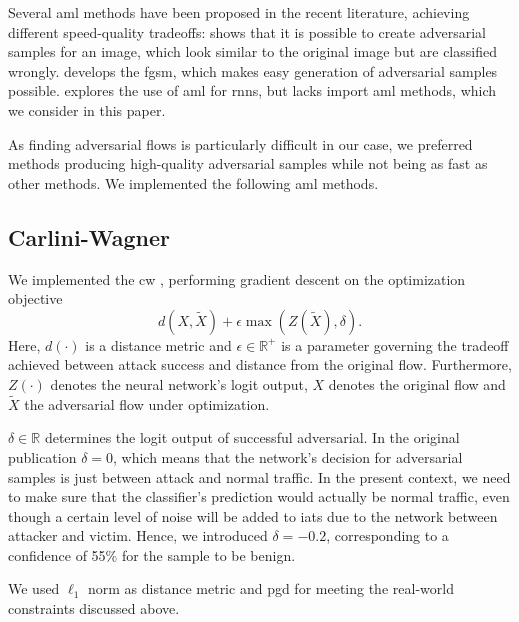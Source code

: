 \documentclass[conference]{IEEEtran}
\begin{document}
Several \gls{aml} methods have been proposed in the recent literature, achieving different speed-quality tradeoffs: 
\cite{szegedy_intriguing_2014} shows that it is possible to create adversarial samples for an image, which look similar to the original image but are classified wrongly. \cite{goodfellow_explaining_2015} develops the \gls{fgsm}, which makes easy generation of adversarial samples possible. \cite{papernot_crafting_2016} explores the use of \gls{aml} for \glspl{rnn}, but lacks import \gls{aml} methods, which we consider in this paper.

As finding adversarial flows is particularly difficult in our case, %
we preferred methods  producing high-quality adversarial samples while not being as fast as other methods. We implemented the following \gls{aml} methods.

\subsection{Carlini-Wagner}
We implemented the \gls{cw} \cite{carlini_towards_2017}, performing gradient descent on the optimization objective
\begin{equation} \label{eq:carliniWagner}
d(X,\tilde X) + \epsilon  \max(Z(\tilde X), \delta).
\end{equation}
Here, $d(\cdot)$ is a distance metric and $\epsilon \in \mathbb R^+$ is a parameter governing the tradeoff achieved between attack success and distance from the original flow. Furthermore, $Z(\cdot)$ denotes the neural network's logit output, $X$ denotes the original flow and $\tilde X$ the adversarial flow under optimization.

$\delta \in \mathbb R$ determines the logit output of successful adversarial.
In the original publication $\delta=0$, which means that the network's decision for adversarial samples is just between attack and normal traffic. In the present context, we need to make sure that the classifier's prediction would actually be normal traffic, even though a certain level of noise will be added to \glspl{iat} due to the network between attacker and victim. Hence, we introduced $\delta=-0.2$, corresponding to a confidence of 55\% for the sample to be benign.

We used $\ell_1$ norm as distance metric and \gls{pgd} for meeting the real-world constraints discussed above.

\end{document}

